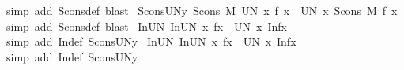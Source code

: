 \begin{isabellebody}
%
\isadelimproof
%
\endisadelimproof
%
\isatagproof
{}\isamarkupfalse%
\ {\isacharparenleft}simp\ add{\isacharcolon}\ Scons{\isacharunderscore}def{\isacharcomma}\ blast{\isacharparenright}%
\endisatagproof
{\isafoldproof}%
%
\isadelimproof
\isanewline
%
\endisadelimproof
\isanewline
{}\isamarkupfalse%
\ Scons{\isacharunderscore}UN{}{\isacharunderscore}y{\isacharcolon}\ {\isachardoublequoteopen}Scons\ M\ {\isacharparenleft}UN\ x{\isachardot}\ f\ x{\isacharparenright}\ {\isacharequal}\ {\isacharparenleft}UN\ x{\isachardot}\ Scons\ M\ {\isacharparenleft}f\ x{\isacharparenright}{\isacharparenright}{\isachardoublequoteclose}\isanewline
%
\isadelimproof
%
\endisadelimproof
%
\isatagproof
{}\isamarkupfalse%
\ {\isacharparenleft}simp\ add{\isacharcolon}\ Scons{\isacharunderscore}def{\isacharcomma}\ blast{\isacharparenright}%
\endisatagproof
{\isafoldproof}%
%
\isadelimproof
\isanewline
%
\endisadelimproof
\isanewline
{}\isamarkupfalse%
\ In{}{\isacharunderscore}UN{}{\isacharcolon}\ {\isachardoublequoteopen}In{}{\isacharparenleft}UN\ x{\isachardot}\ f{\isacharparenleft}x{\isacharparenright}{\isacharparenright}\ {\isacharequal}\ {\isacharparenleft}UN\ x{\isachardot}\ In{}{\isacharparenleft}f{\isacharparenleft}x{\isacharparenright}{\isacharparenright}{\isacharparenright}{\isachardoublequoteclose}\isanewline
%
\isadelimproof
%
\endisadelimproof
%
\isatagproof
{}\isamarkupfalse%
\ {\isacharparenleft}simp\ add{\isacharcolon}\ In{}{\isacharunderscore}def\ Scons{\isacharunderscore}UN{}{\isacharunderscore}y{\isacharparenright}%
\endisatagproof
{\isafoldproof}%
%
\isadelimproof
\isanewline
%
\endisadelimproof
\isanewline
{}\isamarkupfalse%
\ In{}{\isacharunderscore}UN{}{\isacharcolon}\ {\isachardoublequoteopen}In{}{\isacharparenleft}UN\ x{\isachardot}\ f{\isacharparenleft}x{\isacharparenright}{\isacharparenright}\ {\isacharequal}\ {\isacharparenleft}UN\ x{\isachardot}\ In{}{\isacharparenleft}f{\isacharparenleft}x{\isacharparenright}{\isacharparenright}{\isacharparenright}{\isachardoublequoteclose}\isanewline
%
\isadelimproof
%
\endisadelimproof
%
\isatagproof
{}\isamarkupfalse%
\ {\isacharparenleft}simp\ add{\isacharcolon}\ In{}{\isacharunderscore}def\ Scons{\isacharunderscore}UN{}{\isacharunderscore}y{\isacharparenright}%
\endisatagproof
{\isafoldproof}%
%
\isadelimproof
\isanewline
%
\endisadelimproof
\isanewline
\isanewline

\end{isabellebody}

